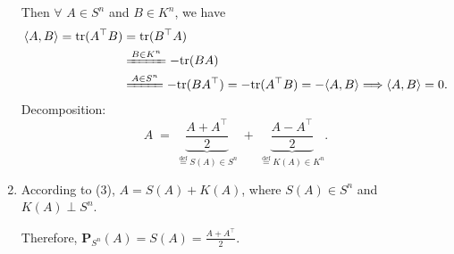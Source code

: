 \documentclass[11pt,letter,notitlepage]{article}
\begin{document}
\begin{solution}
\begin{enumerate}
	Then $\forall$ $A \in S^n$ and $B \in K^n$, we have
	\begin{align*}
	\langle A, B \rangle
	=
	\text{tr}(A^\top B)
	&=
	\text{tr}(B^\top A)\\
	&\xlongequal{B \in K^n}
	-\text{tr}(BA)\\
	&\xlongequal{A \in S^n}
	-\text{tr}(B A^\top)
	=
	-\text{tr}(A^\top B)
	=
	-\langle A, B \rangle
	\Longrightarrow
	\langle A, B \rangle = 0.
	\end{align*}
	Decomposition:
	\[
	A \;=\; \underbrace{\frac{A + A^{\top}}{2}}_{\overset{\text{def}}{=}S(A)\in S^n}
	\;+\;
	\underbrace{\frac{A - A^{\top}}{2}}_{\overset{\text{def}}{=}K(A)\in K^n}.
	\]
	\item 
	According to (3), $A = S(A) + K(A)$, where $S(A) \in S^n$ and $K(A) \perp S^n$.

	Therefore, $\mathbf{P}_{S^n}(A) = S(A) = \frac{A + A^\top}{2}$.
\end{enumerate}
\end{solution}
\end{document}
